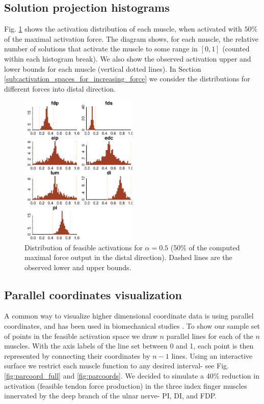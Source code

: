 \subsection*{Solution projection histograms}
Fig. \ref{fig:raw_histograms} shows the activation distribution of each muscle, when activated with $50\%$ of the maximal activation force. The diagram shows, for each muscle, the relative number of solutions that activate the muscle to some range in $[0,1]$ (counted within each histogram break).
We also show the observed activation upper and lower bounds for each muscle (vertical dotted lines).
In Section \ref{sub:activation_spaces_for_increasing_force} we consider the distributions for different forces into distal direction.
\begin{figure}[h]
\centering
\includegraphics[width=0.5\textwidth]{figs/raw_histograms.pdf}
\caption{Distribution of feasible activations for $\alpha= 0.5$ (50\% of the computed maximal force output in the distal direction). Dashed lines are the observed lower and upper bounds.}
\label{fig:raw_histograms}
\end{figure}

\subsection*{Parallel coordinates visualization}
A common way to visualize higher dimensional coordinate data is using parallel coordinates, and has been used in biomechanical studies \cite{bachynskyi2013biomechanical, krekel2010visual}.
To show our sample set of points in the feasible activation space we draw $n$ parallel lines for each of the $n$ muscles.
With the axis labels of the line set between 0 and 1, each point is then represented by connecting their coordinates by $n-1$ lines.
Using an interactive surface we restrict each muscle function to any desired interval- see Fig. \ref{fig:parcoord_full} and \ref{fig:parcoords}.
We decided to simulate a 40\% reduction in activation (feasible tendon force production) in the three index finger muscles innervated by the deep branch of the ulnar nerve- PI, DI, and FDP. 


